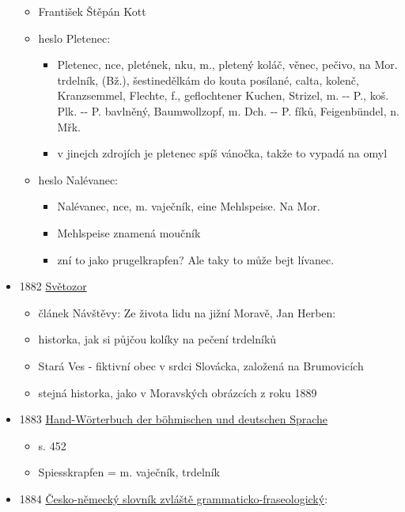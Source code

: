 \begin{itemize}
  \begin{itemize}
  \tightlist
  \item
    František Štěpán Kott
  \item
    heslo Pletenec:

    \begin{itemize}
    \tightlist
    \item
      Pletenec, nce, pletének, nku, m., pletený koláč, věnec, pečivo, na
      Mor. trdelník, (Bž.), šestinedělkám do kouta posílané, calta,
      kolenč, Kranzsemmel, Flechte, f., geflochtener Kuchen, Strizel, m.
      -\/- P., koš. Plk. -\/- P. bavlněný, Baumwollzopf, m. Dch. -\/- P.
      fíků, Feigenbündel, n. Mřk.
    \item
      v jinejch zdrojích je pletenec spíš vánočka, takže to vypadá na
      omyl
    \end{itemize}
  \item
    heslo Nalévanec:

    \begin{itemize}
    \tightlist
    \item
      Nalévanec, nce, m. vaječník, eine Mehlspeise. Na Mor.
    \item
      Mehlspeise znamená moučník
    \item
      zní to jako prugelkrapfen? Ale taky to může bejt lívanec.
    \end{itemize}
  \end{itemize}
\item
  1882
  \href{https://ceskadigitalniknihovna.cz/uuid/uuid:ee6245d1-435d-11dd-b505-00145e5790ea}{Světozor}

  \begin{itemize}
  \tightlist
  \item
    článek Návštěvy: Ze života lidu na jižní Moravě, Jan Herben:
  \item
    historka, jak si půjčou kolíky na pečení trdelníků
  \item
    Stará Ves - fiktivní obec v srdci Slovácka, založená na Brumovicích
  \item
    stejná historka, jako v Moravských obrázcích z roku 1889
  \end{itemize}
\item
  1883
  \href{https://www.google.cz/books/edition/Hand_W\%C3\%B6rterbuch_der_b\%C3\%B6hmischen_und_deu/c6KWlveere4C?hl=cs&gbpv=1&dq=trdeln\%C3\%ADk&pg=PA452&printsec=frontcover}{Hand-Wörterbuch
  der böhmischen und deutschen Sprache }

  \begin{itemize}
  \tightlist
  \item
    s. 452
  \item
    Spiesskrapfen = m. vaječník, trdelník
  \end{itemize}
\item
  1884
  \href{https://ndk.cz/uuid/uuid:78814bf1-f124-4c26-99b4-3ce6ef0458ea}{Česko-německý
  slovník zvláště grammaticko-fraseologický}:


\end{itemize}
